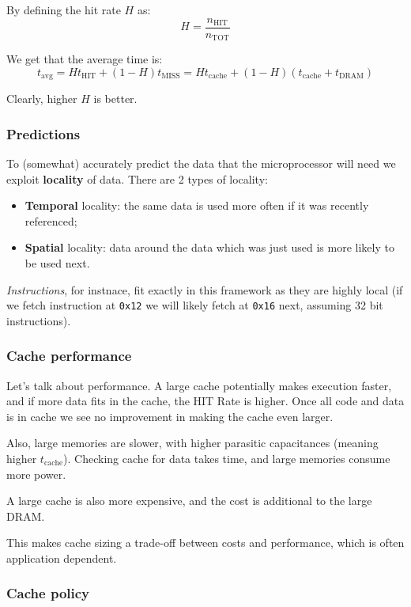 \documentclass[a4paper,11pt]{article}
\begin{document}
By defining the hit rate $H$ as:
$$
	H = \frac{n_\text{HIT}}{n_\text{TOT}}
$$

We get that the average time is:
$$
	t_\text{avg} = H t_\text{HIT} + (1 - H) t_\text{MISS}
	= H t_\text{cache} + (1 - H) (t_\text{cache} + t_\text{DRAM})
$$

Clearly, higher $H$ is better.

\subsubsection{Predictions}

To (somewhat) accurately predict the data that the microprocessor will need we exploit \textbf{locality} of data.
There are 2 types of locality:
\begin{itemize}
	\item \textbf{Temporal} locality: the same data is used more often if it was recently referenced;
	\item \textbf{Spatial} locality: data around the data which was just used is more likely to be used next.
\end{itemize}

\textit{Instructions}, for instnace, fit exactly in this framework as they are highly local (if we fetch instruction at \texttt{0x12} we will likely fetch at \texttt{0x16} next, assuming 32 bit instructions).

\subsubsection{Cache performance}

Let's talk about performance.
A large cache potentially makes execution faster, and if more data fits in the cache, the HIT Rate is higher.
Once all code and data is in cache we see no improvement in making the cache even larger.

Also, large memories are slower, with higher parasitic capacitances (meaning higher $t_\text{cache}$).
Checking cache for data takes time, and large memories consume more power.

A large cache is also more expensive, and the cost is additional to the large DRAM.

This makes cache sizing a trade-off between costs and performance, which is often application dependent.

\subsubsection{Cache policy}
\end{document}
